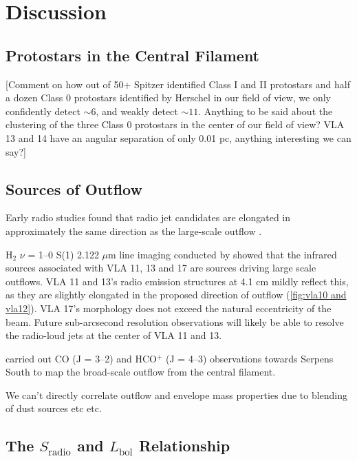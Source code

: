 \documentclass[apj]{emulateapj}
\begin{document}
\section{Discussion}
\label{sec:discussion}

\subsection{Protostars in the Central Filament}
\label{sec:central filament}

[Comment on how out of 50+ Spitzer identified Class I and II protostars and half a dozen Class 0 protostars identified by Herschel in our field of view, we only confidently detect $\sim6$, and weakly detect $\sim11$. Anything to be said about the clustering of the three Class 0 protostars in the center of our field of view? VLA 13 and 14 have an angular separation of only 0.01 pc, anything interesting we can say?]

\subsection{Sources of Outflow}
\label{sec:outflows}
Early radio studies found that radio jet candidates are elongated in approximately the same direction as the large-scale outflow \citep{Anglada95}. 

H$_{2}$ $\nu$ = 1--0 S(1) 2.122 $\mu$m line imaging conducted by \citet{Teixeira12} showed that the infrared sources associated with VLA 11, 13 and 17 are sources driving large scale outflows. VLA 11 and 13's radio emission structures at 4.1 cm mildly reflect this, as they are slightly elongated in the proposed direction of outflow (\autoref{fig:vla10 and vla12}). VLA 17's morphology does not exceed the natural eccentricity of the beam. Future sub-arcsecond resolution observations will likely be able to resolve the radio-loud jets at the center of VLA 11 and 13.

\citet{Nakamura11} carried out CO (J = 3--2) and HCO$^{+}$ (J = 4--3) observations towards Serpens South to map the broad-scale outflow from the central filament.  

We can't directly correlate outflow and envelope mass properties due to blending of dust sources etc etc.

\subsection{The $S_{\text{radio}}$ and $L_{\text{bol}}$ Relationship}
\label{sec:correlations}
\end{document}
